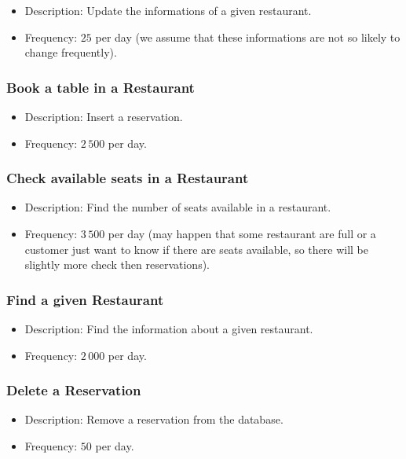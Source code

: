 \begin{itemize}
	\item Description: Update the informations of a given restaurant.
	\item Frequency: \(25\) per day (we assume that these informations are
		not so likely to change frequently).
\end{itemize}

\subsubsection{Book a table in a Restaurant}

\begin{itemize}
	\item Description: Insert a reservation.
	\item Frequency: \(2\,500\) per day.
\end{itemize}


\subsubsection{Check available seats in a Restaurant}

\begin{itemize}
	\item Description: Find the number of seats available in a restaurant.
	\item Frequency: \(3\,500\) per day (may happen that some restaurant are
		full or a customer just want to know if there are seats
		available, so there will be slightly more check then
		reservations).
\end{itemize}

\subsubsection{Find a given Restaurant}

\begin{itemize}
	\item Description: Find the information about a given restaurant.
	\item Frequency: \(2\,000\) per day.
\end{itemize}


\subsubsection{Delete a Reservation}

\begin{itemize}
	\item Description: Remove a reservation from the database.
	\item Frequency: \(50\) per day.
\end{itemize}

